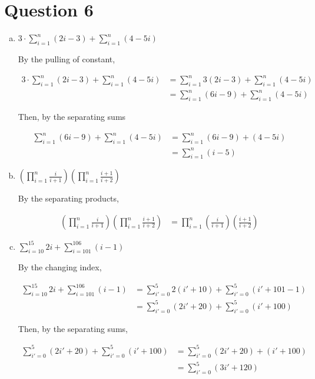 \documentclass[12pt]{article}
\begin{document}
\section*{Question 6}
\begin{enumerate}[a.]
    \item

    $3 \cdot \sum\limits_{i=1}^n (2i - 3) + \sum\limits_{i=1}^n (4 - 5i)$

    \bigskip

    By the pulling of constant,

    \begin{align*}
        3 \cdot \sum\limits_{i=1}^n (2i - 3) + \sum\limits_{i=1}^n (4 - 5i) &= \sum\limits_{i=1}^n 3(2i-3) + \sum\limits_{i=1}^n (4 - 5i)\\
        &= \sum\limits_{i=1}^n (6i-9) + \sum\limits_{i=1}^n (4 - 5i)
    \end{align*}

    \bigskip

    Then, by the separating sums

    \begin{align*}
        \sum\limits_{i=1}^n (6i-9) + \sum\limits_{i=1}^n (4 - 5i) &= \sum\limits_{i=1}^n (6i-9) + (4 - 5i)\\
        &= \sum\limits_{i=1}^n (i-5)
    \end{align*}

    \item

    $\left( \prod\limits_{i=1}^n \frac{i}{i+1} \right) \left( \prod\limits_{i=1}^n \frac{i+1}{i+2} \right)$

    \bigskip

    By the separating products,

    \begin{align*}
        \left( \prod\limits_{i=1}^n \frac{i}{i+1} \right) \left( \prod\limits_{i=1}^n \frac{i+1}{i+2} \right) &= \prod\limits_{i=1}^n \left( \frac{i}{i+1} \right) \left( \frac{i+1}{i+2} \right)
    \end{align*}

    \item

    $\sum\limits_{i=10}^15 2i + \sum\limits_{i=101}^{106} (i-1)$

    \bigskip

    By the changing index,

    \begin{align*}
        \sum\limits_{i=10}^15 2i + \sum\limits_{i=101}^{106} (i-1) &= \sum\limits_{i'=0}^5 2(i' + 10) + \sum\limits_{i'=0}^5 (i'+101-1)\\
        &= \sum\limits_{i'=0}^5 (2i' + 20) + \sum\limits_{i'=0}^5 (i'+100)
    \end{align*}

    \bigskip

    Then, by the separating sums,

    \begin{align*}
        \sum\limits_{i'=0}^5 (2i' + 20) + \sum\limits_{i'=0}^5 (i'+100) &= \sum\limits_{i'=0}^5 (2i' + 20) + (i'+100)\\
        &= \sum\limits_{i'=0}^5 (3i' + 120)
    \end{align*}
\end{enumerate}
\end{document}
